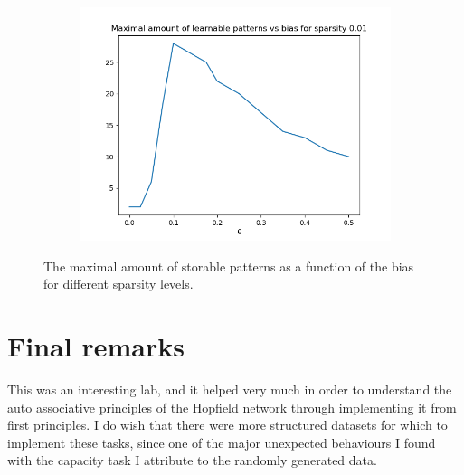 \documentclass[a4paper]{article}
\begin{document}
\begin{figure}[ht]
\begin{subfigure}[b]{0.3\textwidth}
  \end{subfigure}
  \begin{subfigure}[b]{0.3\textwidth}
   \centering
   \includegraphics[width=\linewidth]{figures/c150s001.png}
   \end{subfigure}
   \caption{The maximal amount of storable patterns as a function of the bias for different sparsity levels.}
   \label{fig:sparsity}
\end{figure}
\section{Final remarks }
This was an interesting lab, and it helped very much in order to understand the auto associative principles of the Hopfield network through implementing it from first principles. I do wish that there were more structured datasets for which to implement these tasks, since one of the major unexpected behaviours I found with the capacity task I attribute to the randomly generated data.
\end{document}
